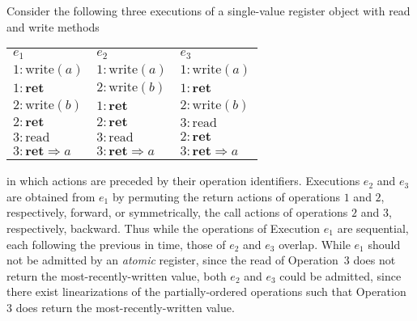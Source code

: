\begin{example}
  \label{ex:executions}

  Consider the following three executions of a single-value register object
  with read and write methods
  \begin{center}
    \setlength{\tabcolsep}{1em}
    \begin{tabular}{l|l|l}
      $e_1$                           & $e_2$                           & $e_3$ \\
      $1:\mathrm{write}(a)$           & $1:\mathrm{write}(a)$           & $1:\mathrm{write}(a)$ \\
      $1:\mathbf{ret}$                & $2:\mathrm{write}(b)$           & $1:\mathbf{ret}$ \\
      $2:\mathrm{write}(b)$           & $1:\mathbf{ret}$                & $2:\mathrm{write}(b)$ \\
      $2:\mathbf{ret}$                & $2:\mathbf{ret}$                & $3:\mathrm{read}$ \\
      $3:\mathrm{read}$               & $3:\mathrm{read}$               & $2:\mathbf{ret}$ \\
      $3:\mathbf{ret} \Rightarrow a$  & $3:\mathbf{ret} \Rightarrow a$  & $3:\mathbf{ret} \Rightarrow a$ \\
    \end{tabular}
  \end{center}
  in which actions are preceded by their operation identifiers. Executions
  $e_2$ and $e_3$ are obtained from $e_1$ by permuting the return actions of
  operations $1$ and $2$, respectively, forward, or symmetrically, the call
  actions of operations $2$ and $3$, respectively, backward. Thus while the
  operations of Execution $e_1$ are sequential, each following the previous in
  time, those of $e_2$ and $e_3$ overlap. While $e_1$ should not be admitted
  by an \emph{atomic} register, since the read of Operation~$3$ does not
  return the most-recently-written value, both $e_2$ and $e_3$ could be
  admitted, since there exist linearizations of the partially-ordered operations
  such that Operation~$3$ does return the most-recently-written value.

\end{example}

